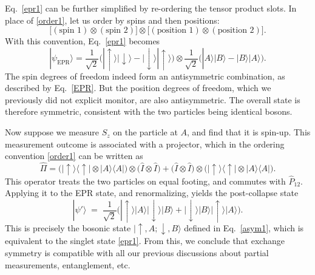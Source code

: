 \documentclass[prx,12pt]{revtex4-2}
\begin{document}
Eq.~\eqref{epr1} can be further simplified by re-ordering the tensor
product slots.  In place of \eqref{order1}, let us order by spins and
then positions:
\begin{equation}
  \Big[
    (\textrm{spin 1}) \otimes (\textrm{spin 2}) \Big]
  \otimes
  \Big[
    (\textrm{position 1}) \otimes (\textrm{position 2}) \Big].
  \label{order2}
\end{equation}
With this convention, Eq.~\eqref{epr1} becomes
\begin{equation}
  |\psi_{\mathrm{EPR}}\rangle = \frac{1}{\sqrt{2}} \Big(
  |\!\uparrow\rangle |\!\downarrow\rangle - |\!\downarrow\rangle |\!\uparrow\rangle \Big)  
  \otimes \frac{1}{\sqrt{2}} \Big(
  |A\rangle |B\rangle - |B\rangle |A\rangle \Big).
  \label{eprsplit}
\end{equation}
The spin degrees of freedom indeed form an antisymmetric combination,
as described by Eq.~\eqref{EPR}.  But the position degrees of freedom,
which we previously did not explicit monitor, are also antisymmetric.
The overall state is therefore symmetric, consistent with the two
particles being identical bosons.

Now suppose we measure $S_z$ on the particle at $A$, and find that it
is spin-up.  This measurement outcome is associated with a projector,
which in the ordering convention \eqref{order1} can be written as
\begin{equation}
  \hat{\Pi} = \Big(|\!\uparrow\rangle \langle\uparrow\!| \otimes |A\rangle \langle A|\Big)
  \otimes\Big( \hat{I} \otimes \hat{I}\Big)
  + \Big(\hat{I} \otimes \hat{I} \Big) \otimes \Big(
  |\!\uparrow\rangle \langle\uparrow\!| \otimes |A\rangle \langle A| \Big).
\end{equation}
This operator treats the two particles on equal footing, and commutes
with $\hat{P}_{12}$.  Applying it to the EPR state, and renormalizing,
yields the post-collapse state
\begin{equation}
  |\psi'\rangle \;=\;
  \frac{1}{\sqrt{2}} \Big(
    |\!\uparrow\rangle|A\rangle |\!\downarrow\rangle|B\rangle
    + |\!\downarrow\rangle|B\rangle |\!\uparrow\rangle|A\rangle \Big).
\end{equation}
This is precisely the bosonic state $|\uparrow,A;\downarrow,B\rangle$
defined in Eq.~\eqref{asym1}, which is equivalent to the singlet state
\eqref{epr1}.  From this, we conclude that exchange symmetry is
compatible with all our previous discussions about partial
measurements, entanglement, etc.
\end{document}

